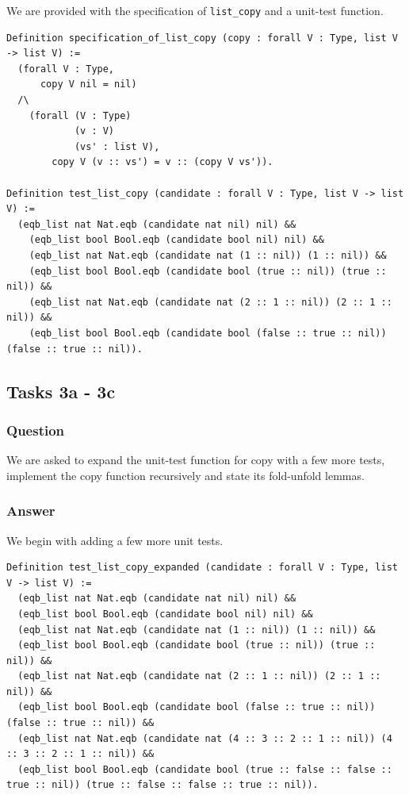 \documentclass{article}
\begin{document}
We are provided with the specification of \texttt{list\_copy} and a unit-test function.

\begin{lstlisting}
Definition specification_of_list_copy (copy : forall V : Type, list V -> list V) :=
  (forall V : Type,
      copy V nil = nil)
  /\
    (forall (V : Type)
            (v : V)
            (vs' : list V),
        copy V (v :: vs') = v :: (copy V vs')).

Definition test_list_copy (candidate : forall V : Type, list V -> list V) :=
  (eqb_list nat Nat.eqb (candidate nat nil) nil) &&
    (eqb_list bool Bool.eqb (candidate bool nil) nil) &&
    (eqb_list nat Nat.eqb (candidate nat (1 :: nil)) (1 :: nil)) &&
    (eqb_list bool Bool.eqb (candidate bool (true :: nil)) (true :: nil)) &&
    (eqb_list nat Nat.eqb (candidate nat (2 :: 1 :: nil)) (2 :: 1 :: nil)) &&
    (eqb_list bool Bool.eqb (candidate bool (false :: true :: nil)) (false :: true :: nil)).
\end{lstlisting}

\subsection{Tasks 3a - 3c}

\subsubsection{Question}
We are asked to expand the unit-test function for copy with a few more tests, implement the copy function recursively and state its fold-unfold lemmas.

\subsubsection{Answer}

We begin with adding a few more unit tests.

\begin{lstlisting}
Definition test_list_copy_expanded (candidate : forall V : Type, list V -> list V) :=
  (eqb_list nat Nat.eqb (candidate nat nil) nil) &&
  (eqb_list bool Bool.eqb (candidate bool nil) nil) &&
  (eqb_list nat Nat.eqb (candidate nat (1 :: nil)) (1 :: nil)) &&
  (eqb_list bool Bool.eqb (candidate bool (true :: nil)) (true :: nil)) &&
  (eqb_list nat Nat.eqb (candidate nat (2 :: 1 :: nil)) (2 :: 1 :: nil)) &&
  (eqb_list bool Bool.eqb (candidate bool (false :: true :: nil)) (false :: true :: nil)) &&
  (eqb_list nat Nat.eqb (candidate nat (4 :: 3 :: 2 :: 1 :: nil)) (4 :: 3 :: 2 :: 1 :: nil)) &&
  (eqb_list bool Bool.eqb (candidate bool (true :: false :: false :: true :: nil)) (true :: false :: false :: true :: nil)).
\end{lstlisting}
\end{document}
